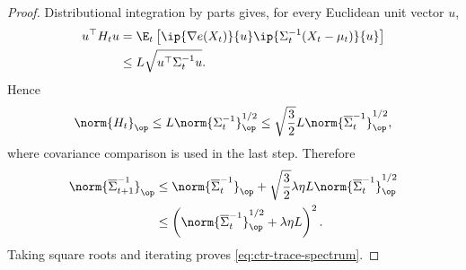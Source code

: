 \begin{proof}
    Distributional integration by parts gives, for every Euclidean unit vector
    $u$,
    \begin{align}
        u^\top H_tu
         & =\E_t\left[
            \ip{\nabla e(X_t)}{u}
            \ip{\Sigma_t^{-1}(X_t-\mu_t)}{u}
            \right]
        \\
         & \leq L\sqrt{u^\top\Sigma_t^{-1}u}.
    \end{align}
    Hence
    \begin{align}
        \norm{H_t}_{\op}
        \leq L\norm{\Sigma_t^{-1}}_{\op}^{1/2}
        \leq\sqrt{\frac32}L
        \norm{\overline\Sigma_t^{-1}}_{\op}^{1/2},
        \label{eq:ctr-H-op-bound}
    \end{align}
    where covariance comparison is used in the last step.  Therefore
    \begin{align}
        \norm{\overline\Sigma_{t+1}^{-1}}_{\op}
         & \leq
        \norm{\overline\Sigma_t^{-1}}_{\op}
        +\sqrt{\frac32}\lambda\eta L
        \norm{\overline\Sigma_t^{-1}}_{\op}^{1/2}
        \\
         & \leq
        \left(
        \norm{\overline\Sigma_t^{-1}}_{\op}^{1/2}
        +\lambda\eta L
        \right)^2.
    \end{align}
    Taking square roots and iterating proves
    \eqref{eq:ctr-trace-spectrum}.


\end{proof}
